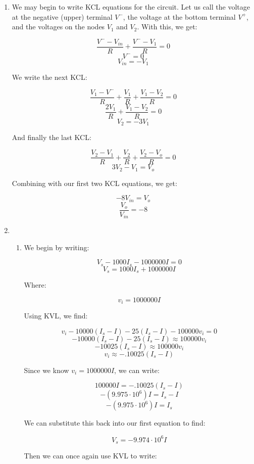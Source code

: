 \begin{enumerate}

  \item

    We may begin to write KCL equations for the circuit. Let us call the voltage at the negative (upper) terminal $V^{-}$, the voltage at the bottom terminal $V^{+}$, and the voltages on the nodes $V_1$ and $V_2$. With this, we get:

    $$\frac{V^{-}-V_{in}}{R}+\frac{V^{-}-V_1}{R}=0$$
    $$V^{-}=0$$
    $$V_{in}=-V_{1}$$

    We write the next KCL:

    $$\frac{V_1-V^{-}}{R}+\frac{V_1}{R}+\frac{V_1-V_2}{R}=0$$
    $$\frac{2V_1}{R}+\frac{V_1-V_2}{R}=0$$
    $$V_2=-3V_1$$

    And finally the last KCL:

    $$\frac{V_2-V_1}{R}+\frac{V_2}{R}+\frac{V_2-V_o}{R}=0$$
    $$3V_2-V_1=V_o$$

    Combining with our first two KCL equations, we get:

    $$-8V_{in}=V_o$$
    $$\boxed{\frac{V_o}{V_{in}}=-8}$$

  \item

    \begin{enumerate}

      \item 

        We begin by writing:

        $$V_{s}-1000I_{s}-1000000I=0$$
        $$V_{s}=1000I_{s}+1000000I$$

        Where:

        $$v_{i}=1000000I$$

        Using KVL, we find:

        $$v_i-10000(I_s-I)-25(I_s-I)-100000v_i=0$$
        $$-10000(I_s-I)-25(I_s-I)\approx 100000v_i$$
        $$-10025(I_s-I)\approx 100000v_i$$
        $$v_i\approx -.10025(I_s-I)$$

        Since we know $v_i=1000000I$, we can write:

        $$100000I=-.10025(I_s-I)$$
        $$-(9.975\cdot10^6)I=I_s-I$$
        $$-(9.975\cdot10^6)I=I_s$$

        We can substitute this back into our first equation to find:

        $$V_s=-9.974\cdot10^6I$$

        Then we can once again use KVL to write:


\end{enumerate}
\end{enumerate}
